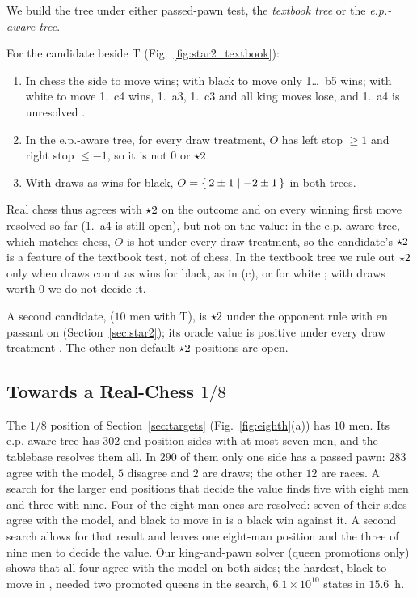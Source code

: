 We build the tree under either passed-pawn test, the \emph{textbook tree} or the \emph{e.p.-aware tree}.

\begin{theorem}\label{thm:oracle-cand}
For the candidate  beside T (Fig.~\ref{fig:star2_textbook}):
\begin{enumerate}
\item[(a)] In chess the side to move wins; with black to move only 1\ldots~b5 wins; with white to
  move 1.~c4 wins, 1.~a3, 1.~c3 and all king moves lose, and 1.~a4 is unresolved .
\item[(b)] In the e.p.-aware tree, for every draw treatment, $O$ has left stop $\ge1$ and right stop $\le-1$, so
  it is not $0$ or $\mathord{\star2}$.
\item[(c)] With draws as wins for black, $O=\{\,2\pm1 \mid -2\pm1\,\}$ in both trees.
\end{enumerate}
\end{theorem}

Real chess thus agrees with $\mathord{\star2}$ on the outcome and on every winning first move resolved so far
(1.~a4 is still open), but not on the value: in the e.p.-aware tree, which matches chess, $O$ is hot under every draw treatment, so
the candidate's $\mathord{\star2}$ is a feature of the textbook test, not of chess. In the textbook tree we rule out
$\mathord{\star2}$ only when draws count as wins for black, as in (c), or for white ; with draws worth $0$ we do
not decide it.

A second candidate,  ($10$ men with T), is $\mathord{\star2}$ under the opponent
rule with en passant on (Section~\ref{sec:star2}); its oracle value is positive under every draw treatment
. The other non-default $\mathord{\star2}$ positions are open.

\subsection{Towards a Real-Chess \texorpdfstring{$1/8$}{1/8}}\label{sec:real-eighth}

The $1/8$ position of Section~\ref{sec:targets} (Fig.~\ref{fig:eighth}(a)) has $10$ men. Its e.p.-aware tree
has $302$ end-position sides with at most seven men, and the tablebase resolves them all. In $290$ of them
only one side has a passed pawn: $283$ agree with the model, $5$ disagree and $2$ are draws; the other $12$ are
races. A search for the larger end positions that decide the value finds five with eight men and three with
nine. Four of the eight-man ones are resolved: seven of their sides agree with the model, and black to move in
 is a black win against it. A second search allows for that result and leaves one
eight-man position and the three of nine men to decide the value. Our king-and-pawn solver (queen promotions
only) shows that all four agree with the model on both sides; the hardest, black to move in
, needed two promoted queens in the search, $6.1\times10^{10}$ states in $15.6$~h.

